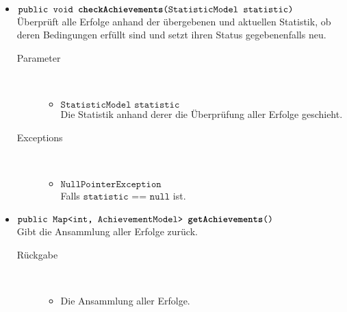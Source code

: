 \begin{description}
\begin{itemize}
		\item $\texttt{public void \textbf{checkAchievements}(StatisticModel statistic)}$ \\ Überprüft alle Erfolge anhand der übergebenen und aktuellen Statistik, ob deren Bedingungen erfüllt sind und setzt ihren Status gegebenenfalls neu.
		\begin{description}
		\item[Parameter] \hfill \\
			\vspace{-.8cm}
			\begin{itemize}
				\item $\texttt{StatisticModel statistic}$ \\ Die Statistik anhand derer die Überprüfung aller Erfolge geschieht. 
			\end{itemize}
			\item[Exceptions] \hfill \\
			\vspace{-.8cm}
			\begin{itemize}
				\item $\texttt{NullPointerException}$ \\ Falls $\texttt{statistic == null}$ ist.
			\end{itemize}
		\end{description}	
		
		\item $\texttt{public Map<int, AchievementModel> \textbf{getAchievements}()}$ \\ Gibt die Ansammlung aller Erfolge zurück.
		\begin{description}
			\item[Rückgabe] \hfill \\
			\vspace{-.8cm}
			\begin{itemize}
				\item Die Ansammlung aller Erfolge.
			\end{itemize}
		\end{description}
		

\end{itemize}
\end{description}
